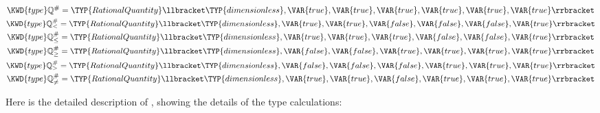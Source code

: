 \begin{Fortress}
\(\KWD{type} \mathbb{Q}^{\#} = \TYP{RationalQuantity}\llbracket\mathbin{\TYP{dimensionless}},\VAR{true},\VAR{true},\VAR{true},\VAR{true},\VAR{true},\VAR{true}\rrbracket\)\\
\(\KWD{type} \mathbb{Q}^{\#}_{<} = \TYP{RationalQuantity}\llbracket\mathbin{\TYP{dimensionless}},\VAR{true},\VAR{true},\VAR{false},\VAR{false},\VAR{false},\VAR{true}\rrbracket\)\\
\(\KWD{type} \mathbb{Q}^{\#}_{\leq} = \TYP{RationalQuantity}\llbracket\mathbin{\TYP{dimensionless}},\VAR{true},\VAR{true},\VAR{true},\VAR{false},\VAR{false},\VAR{true}\rrbracket\)\\
\(\KWD{type} \mathbb{Q}^{\#}_{\geq} = \TYP{RationalQuantity}\llbracket\mathbin{\TYP{dimensionless}},\VAR{false},\VAR{false},\VAR{true},\VAR{true},\VAR{true},\VAR{true}\rrbracket\)\\
\(\KWD{type} \mathbb{Q}^{\#}_{>} = \TYP{RationalQuantity}\llbracket\mathbin{\TYP{dimensionless}},\VAR{false},\VAR{false},\VAR{false},\VAR{true},\VAR{true},\VAR{true}\rrbracket\)\\
\(\KWD{type} \mathbb{Q}^{\#}_{\neq} = \TYP{RationalQuantity}\llbracket\mathbin{\TYP{dimensionless}},\VAR{true},\VAR{true},\VAR{false},\VAR{true},\VAR{true},\VAR{true}\rrbracket\)
\end{Fortress}

Here is the detailed description of , showing the details
of the type calculations:

